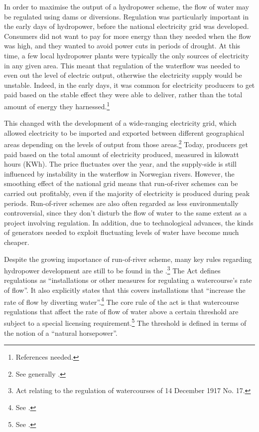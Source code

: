 In order to maximise the output of a hydropower scheme, the flow of water may be regulated using dams or diversions. Regulation was particularly important in the early days of hydropower, before the national electricity grid was developed. Consumers did not want to pay for more energy than they needed when the flow was high, and they wanted to avoid power cuts in periods of drought. At this time, a few local hydropower plants were typically the only sources of electricity in any given area. This meant that regulation of the waterflow was needed to even out the level of electric output, otherwise the electricity supply would be unstable. Indeed, in the early days, it was common for electricity producers to get paid based on the stable effect they were able to deliver, rather than the total amount of energy they harnessed.\footnote{References needed.}

This changed with the development of a wide-ranging electricity grid, which allowed electricity to be imported and exported between different geographical areas depending on the levels of output from those areas.\footnote{See generally \cite{sofienlund07}.} Today, producers get paid based on the total amount of electricity produced, measured in kilowatt hours (KWh). The price fluctuates over the year, and the supply-side is still influenced by instability in the waterflow in Norwegian rivers. However, the smoothing effect of the national grid means that run-of-river schemes can be carried out profitably, even if the majority of electricity is produced during peak periods. Run-of-river schemes are also often regarded as less environmentally controversial, since they don't disturb the flow of water to the same extent as a project involving regulation. In addition, due to technological advances, the kinds of generators needed to exploit fluctuating levels of water have become much cheaper. 

Despite the growing importance of run-of-river scheme, many key rules regarding hydropower development are still to be found in the \cite{wra17}.\footnote{Act relating to the regulation of watercourses of 14 December 1917 No. 17.} The Act defines regulations as ``installations or other measures for regulating a watercourse's rate of flow''. It also explicitly states that this covers installations that ``increase the rate of flow by diverting water''.\footnote{See \cite[1]{wra17}.} The core rule of the act is that watercourse regulations that affect the rate of flow of water above a certain threshold are subject to a special licensing requirement.\footnote{See \cite[2]{wra17}.} The threshold is defined in terms of the notion of a ``natural horsepower''.

